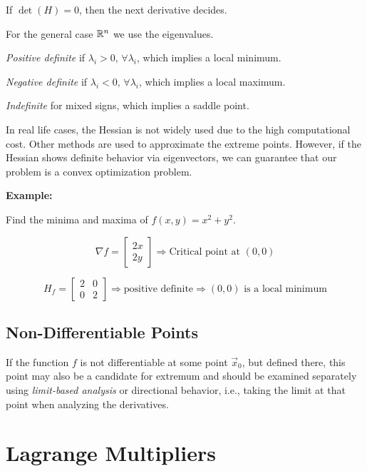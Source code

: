 \begin{enumerate}
        \subitem If \(\det(H) = 0\), then the next derivative decides.

        For the general case \(\mathbb{R}^n\) we use the eigenvalues.

        \subitem \emph{Positive definite} if \(\lambda_i > 0,\, \forall \lambda_i\), which implies a local minimum.

        \subitem \emph{Negative definite} if \(\lambda_i < 0,\, \forall \lambda_i\), which implies a local maximum.

        \subitem \emph{Indefinite} for mixed signs, which implies a saddle point.

\end{enumerate}

In real life cases, the Hessian is not widely used due to the high computational cost. Other methods are used to approximate the 
extreme points. However, if the Hessian shows definite behavior via eigenvectors, we can guarantee that our problem is a convex optimization problem.

\textbf{Example: }

Find the minima and maxima of \( f(x, y) = x^2 + y^2 \).

\[
    \nabla f = \begin{bmatrix} 2x \\ 2y \end{bmatrix} \Rightarrow \text{Critical point at } (0, 0)
\]

\[
    H_f = \begin{bmatrix} 2 & 0 \\ 0 & 2 \end{bmatrix} \Rightarrow \text{positive definite}
    \Rightarrow (0, 0) \text{ is a local minimum}
\]

\subsection{Non-Differentiable Points}

If the function \(f\) is not differentiable at some point \( \vec{x}_0 \), but defined there, this 
point may also be a candidate for extremum and should be examined separately using \emph{limit-based analysis} 
or directional behavior, i.e., taking the limit at that point when analyzing the derivatives.

\section{Lagrange Multipliers}

